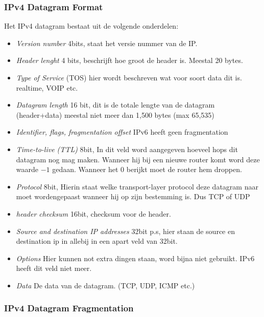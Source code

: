 \subsubsection{IPv4 Datagram Format}
Het IPv4 datagram bestaat uit de volgende onderdelen:
\begin{itemize}
    \item \textit{Version number} 4bits, staat het versie nummer van de IP.
    \item \textit{Header lenght} 4 bits, beschrijft hoe groot de header is. Meestal 20 bytes.
    \item \textit{Type of Service} (TOS) hier wordt beschreven wat voor soort data dit is. realtime, VOIP etc.
    \item \textit{Datagram length} 16 bit, dit is de totale lengte van de datagram (header+data) meestal niet meer dan 1,500 bytes (max 65,535)
    \item \textit{Identifier, flags, fragmentation offset} IPv6 heeft geen fragmentation
    \item \textit{Time-to-live (TTL)} 8bit, In dit veld word aangegeven hoeveel hops dit datagram nog mag maken. Wanneer hij bij een nieuwe router komt word deze waarde $-1$ gedaan. Wanneer het $0$ berijkt moet de router hem droppen.
    \item \textit{Protocol} 8bit, Hierin staat welke transport-layer protocol deze datagram naar moet wordengepaast wanneer hij op zijn bestemming is. Dus TCP of UDP
    \item \textit{header checksum} 16bit, checksum voor de header.
    \item \textit{Source and destination IP addresses} 32bit p.s, hier staan de source en destination ip in allebij in een apart veld van 32bit.
    \item \textit{Options} Hier kunnen not extra dingen staan, word bijna niet gebruikt. IPv6 heeft dit veld niet meer.
    \item \textit{Data} De data van de datagram. (TCP, UDP, ICMP etc.)
\end{itemize}

\subsubsection{IPv4 Datagram Fragmentation}
